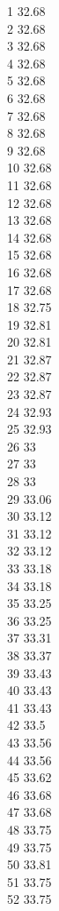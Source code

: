 1	32.68\\
2	32.68\\
3	32.68\\
4	32.68\\
5	32.68\\
6	32.68\\
7	32.68\\
8	32.68\\
9	32.68\\
10	32.68\\
11	32.68\\
12	32.68\\
13	32.68\\
14	32.68\\
15	32.68\\
16	32.68\\
17	32.68\\
18	32.75\\
19	32.81\\
20	32.81\\
21	32.87\\
22	32.87\\
23	32.87\\
24	32.93\\
25	32.93\\
26	33\\
27	33\\
28	33\\
29	33.06\\
30	33.12\\
31	33.12\\
32	33.12\\
33	33.18\\
34	33.18\\
35	33.25\\
36	33.25\\
37	33.31\\
38	33.37\\
39	33.43\\
40	33.43\\
41	33.43\\
42	33.5\\
43	33.56\\
44	33.56\\
45	33.62\\
46	33.68\\
47	33.68\\
48	33.75\\
49	33.75\\
50	33.81\\
51	33.75\\
52	33.75\\
